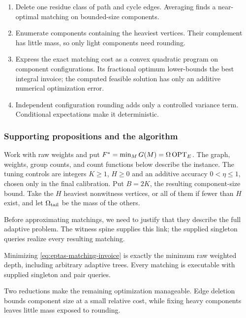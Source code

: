 \begin{proofstrategy}
\begin{enumerate}
\item Delete one residue class of path and cycle edges. Averaging
finds a near-optimal matching on bounded-size components.
\item Enumerate components containing the heaviest vertices. Their
complement has little mass, so only light components need rounding.
\item Express the exact matching cost as a convex quadratic
program on component configurations. Its fractional optimum
lower-bounds the best integral invoice; the computed feasible solution
has only an additive numerical optimization error.
\item Independent configuration rounding adds only a controlled
variance term. Conditional expectations make it deterministic.
\end{enumerate}
\end{proofstrategy}

\subsubsection{Supporting propositions and the algorithm}

Work with raw weights and put $F^*=\min_MG(M)=\Omega\operatorname{OPT}_E$.
The graph, weights, group counts, and count functions below describe
the instance. The tuning controls are integers $K\ge1$, $H\ge0$ and
an additive accuracy $0<\eta\le1$, chosen only in the final calibration.
Put $B=2K$, the resulting component-size bound. Take the $H$ heaviest
nonwitness vertices, or all of them if fewer than $H$ exist, and let
$\Omega_{\rm tail}$ be the mass of the others.

Before approximating matchings, we need to justify that they describe
the full adaptive problem. The witness spine supplies this link;
the supplied singleton queries realize every resulting matching.

\begin{proposition}
\label{prop:pair-invoice-exact}
Minimizing \eqref{eq:eptas-matching-invoice} is exactly the minimum
raw weighted depth, including arbitrary adaptive trees. Every matching
is executable with supplied singleton and pair queries.
\end{proposition}

Two reductions make the remaining optimization manageable. Edge
deletion bounds component size at a small relative cost, while
fixing heavy components leaves little mass exposed to rounding.


